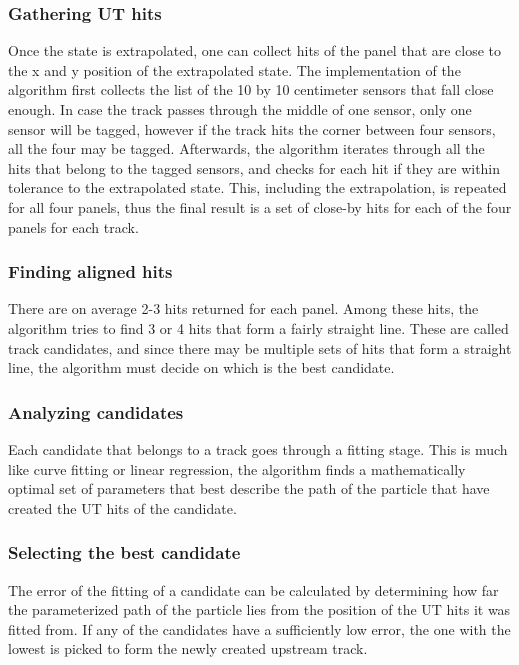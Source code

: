 \documentclass[12pt]{article}
\begin{document}
\subsubsection{Gathering UT hits}

Once the state is extrapolated, one can collect hits of the panel that are close to the x and y position of the extrapolated state. The implementation of the algorithm first collects the list of the 10 by 10 centimeter sensors that fall close enough. In case the track passes through the middle of one sensor, only one sensor will be tagged, however if the track hits the corner between four sensors, all the four may be tagged. Afterwards, the algorithm iterates through all the hits that belong to the tagged sensors, and checks for each hit if they are within tolerance to the extrapolated state. This, including the extrapolation, is repeated for all four panels, thus the final result is a set of close-by hits for each of the four panels for each track.


\subsubsection{Finding aligned hits}

There are on average 2-3 hits returned for each panel. Among these hits, the algorithm tries to find 3 or 4 hits that form a fairly straight line. These are called track candidates, and since there may be multiple sets of hits that form a straight line, the algorithm must decide on which is the best candidate.


\subsubsection{Analyzing candidates}

Each candidate that belongs to a track goes through a fitting stage. This is much like curve fitting or linear regression, the algorithm finds a mathematically optimal set of parameters that best describe the path of the particle that have created the UT hits of the candidate. 


\subsubsection{Selecting the best candidate}

The error of the fitting of a candidate can be calculated by determining how far the parameterized path of the particle lies from the position of the UT hits it was fitted from. If any of the candidates have a sufficiently low error, the one with the lowest is picked to form the newly created upstream track.
\end{document}
